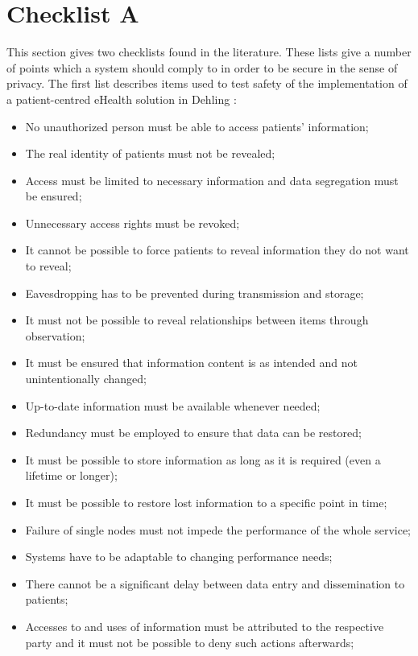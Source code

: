 \section{Checklist A}
\label{security-checklists-a}

This section gives two checklists found in the literature.
These lists give a number of points which a system should comply to in order to be secure in the sense of privacy.
The first list describes items used to test safety of the implementation of a patient-centred eHealth solution in Dehling \cite{s17Dehling2014}:
\begin{itemize}
	\item No unauthorized person must be able to access patients' information;
	\item The real identity of patients must not be revealed;
	\item Access must be limited to necessary information and data segregation must be ensured;
	\item Unnecessary access rights must be revoked;
	\item It cannot be possible to force patients to reveal information they do not want to reveal;
	\item Eavesdropping has to be prevented during transmission and storage;
	\item It must not be possible to reveal relationships between items through observation;
	\item It must be ensured that information content is as intended and not unintentionally changed;
	\item Up-to-date information must be available whenever needed;
	\item Redundancy must be employed to ensure that data can be restored;
	\item It must be possible to store information as long as it is required (even a lifetime or longer);
	\item It must be possible to restore lost information to a specific point in time;
	\item Failure of single nodes must not impede the performance of the whole service;
	\item Systems have to be adaptable to changing performance needs;
	\item There cannot be a significant delay between data entry and dissemination to patients;
	\item Accesses to and uses of information must be attributed to the respective party and it must not be possible to deny such actions afterwards;

\end{itemize}
